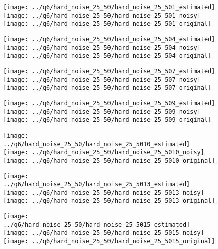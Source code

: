 \documentclass[a4paper,12pt]{article}
\begin{document}
\begin{figure}[!htb]
  \texttt{[image: ../q6/hard\_noise\_25\_50/hard\_noise\_25\_501\_estimated]}
\endminipage\hfill
{}
  \texttt{[image: ../q6/hard\_noise\_25\_50/hard\_noise\_25\_501\_noisy]}
\endminipage\hfill
{}
  \texttt{[image: ../q6/hard\_noise\_25\_50/hard\_noise\_25\_501\_original]}
\endminipage\hfill

  \texttt{[image: ../q6/hard\_noise\_25\_50/hard\_noise\_25\_504\_estimated]}
\endminipage\hfill
{}
  \texttt{[image: ../q6/hard\_noise\_25\_50/hard\_noise\_25\_504\_noisy]}
\endminipage\hfill
{}
  \texttt{[image: ../q6/hard\_noise\_25\_50/hard\_noise\_25\_504\_original]}
\endminipage\hfill

  \texttt{[image: ../q6/hard\_noise\_25\_50/hard\_noise\_25\_507\_estimated]}
\endminipage\hfill
{}
  \texttt{[image: ../q6/hard\_noise\_25\_50/hard\_noise\_25\_507\_noisy]}
\endminipage\hfill
{}
  \texttt{[image: ../q6/hard\_noise\_25\_50/hard\_noise\_25\_507\_original]}
\endminipage\hfill

  \texttt{[image: ../q6/hard\_noise\_25\_50/hard\_noise\_25\_509\_estimated]}
\endminipage\hfill
{}
  \texttt{[image: ../q6/hard\_noise\_25\_50/hard\_noise\_25\_509\_noisy]}
\endminipage\hfill
{}
  \texttt{[image: ../q6/hard\_noise\_25\_50/hard\_noise\_25\_509\_original]}
\endminipage\hfill

  \texttt{[image: ../q6/hard\_noise\_25\_50/hard\_noise\_25\_5010\_estimated]}
\endminipage\hfill
{}
  \texttt{[image: ../q6/hard\_noise\_25\_50/hard\_noise\_25\_5010\_noisy]}
\endminipage\hfill
{}
  \texttt{[image: ../q6/hard\_noise\_25\_50/hard\_noise\_25\_5010\_original]}
\endminipage\hfill

  \texttt{[image: ../q6/hard\_noise\_25\_50/hard\_noise\_25\_5013\_estimated]}
\endminipage\hfill
{}
  \texttt{[image: ../q6/hard\_noise\_25\_50/hard\_noise\_25\_5013\_noisy]}
\endminipage\hfill
{}
  \texttt{[image: ../q6/hard\_noise\_25\_50/hard\_noise\_25\_5013\_original]}
\endminipage\hfill

  \texttt{[image: ../q6/hard\_noise\_25\_50/hard\_noise\_25\_5015\_estimated]}
\endminipage\hfill
{}
  \texttt{[image: ../q6/hard\_noise\_25\_50/hard\_noise\_25\_5015\_noisy]}
\endminipage\hfill
{}
  \texttt{[image: ../q6/hard\_noise\_25\_50/hard\_noise\_25\_5015\_original]}
\endminipage\hfill


\end{figure}
\end{document}
